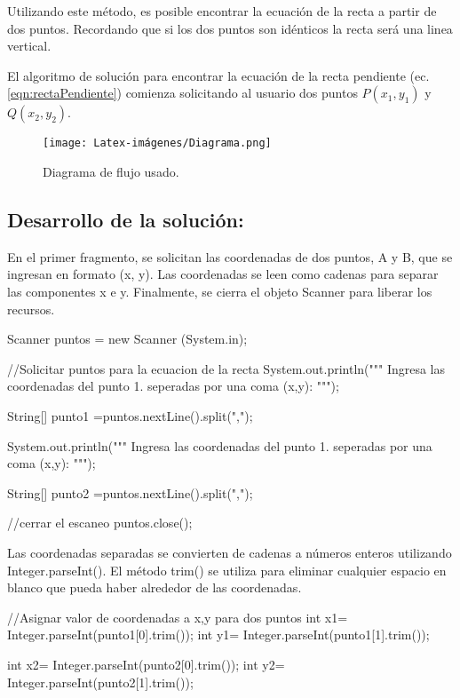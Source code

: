 Utilizando este método, es posible encontrar la ecuación de la recta a partir de dos puntos. Recordando que si los dos puntos son idénticos la recta será una linea vertical.

El algoritmo de solución para encontrar la ecuación de la recta pendiente  (ec. \ref{eqn:rectaPendiente}) comienza solicitando al usuario dos puntos $P(x_{1}, y_{1})$ y $Q(x_{2}, y_{2})$.\\

\centering
\begin{figure}[H]
    \centering
    \texttt{[image: Latex-imágenes/Diagrama.png]}
    \caption{Diagrama de flujo usado.}
\end{figure}


\subsection{\textbf{Desarrollo de la solución:}}
En el primer fragmento, se solicitan las coordenadas de dos puntos, A y B, que se ingresan en formato (x, y). Las coordenadas se leen como cadenas para separar las componentes x e y. Finalmente, se cierra el objeto Scanner para liberar los recursos.

\begin{javaCode}

Scanner puntos = new Scanner (System.in);
        
    //Solicitar puntos para la ecuacion de la recta  
    System.out.println("""
                        Ingresa las coordenadas del punto 1.
                        seperadas por una coma (x,y):
                           """);
    
    String[] punto1 =puntos.nextLine().split(",");
        
    System.out.println("""
                        Ingresa las coordenadas del punto 1.
                        seperadas por una coma (x,y):
                        """);
    
    String[] punto2 =puntos.nextLine().split(",");
        
    //cerrar el escaneo
    puntos.close();
        
\end{javaCode}

Las coordenadas separadas se convierten de cadenas a números enteros utilizando Integer.parseInt(). El método trim() se utiliza para eliminar cualquier espacio en blanco que pueda haber alrededor de las coordenadas.

\begin{javaCode}
    //Asignar valor de coordenadas a x,y para dos puntos
    int x1= Integer.parseInt(punto1[0].trim());
    int y1= Integer.parseInt(punto1[1].trim());
       
    int x2= Integer.parseInt(punto2[0].trim());
    int y2= Integer.parseInt(punto2[1].trim());
\end{javaCode}

